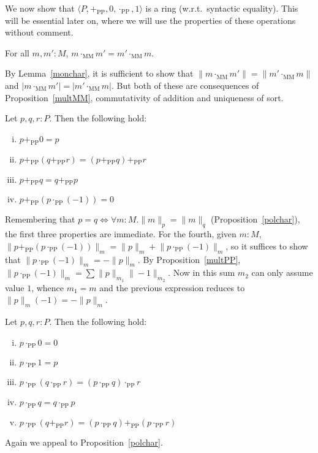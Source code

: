 \documentclass[numreferences]{kluwer}
\newcommand{\coeff}[2]{\ensuremath{\|#2\|_{#1}}}
\newcommand{\multMM}{\ensuremath{\cdot_{\mathrm{MM}}}}
\newcommand{\plusPP}{\ensuremath{+_{\mathrm{PP}}}}
\newcommand{\multPP}{\ensuremath{\cdot_{\mathrm{PP}}}}
\begin{document}
\begin{article}
We now show that $\langle P,\plusPP,0,\multPP,1\rangle$ is a ring
(w.r.t.\ syntactic equality).
This will be essential later on, where we will use the properties
of these operations without comment.

\begin{lemma}\label{multMMcomm}
For all $m,m':M$, $m\multMM m'=m'\multMM m$.
\end{lemma}
\begin{pf}
By Lemma~\ref{monchar}, it is sufficient to show that 
$\|m\multMM m'\|=\|m'\multMM m\|$ and $|m\multMM m'|=|m'\multMM m|$.  But
both of these are consequences of Proposition~\ref{multMM}, commutativity
of addition and uniqueness of sort.
\end{pf}

\begin{lemma}\label{plusPPprops}
Let $p,q,r:P$.  Then the following hold:
\begin{enumerate}[(i)]
\item $p\plusPP0=p$
\item $p\plusPP (q\plusPP r)=(p\plusPP q)\plusPP r$
\item $p\plusPP q=q\plusPP p$
\item $p\plusPP (p\multPP(-1))=0$
\end{enumerate}
\end{lemma}
\begin{pf} Remembering that $p=q\iff \forall m:M.\coeff pm=\coeff qm$
(Proposition~\ref{polchar}), the first three properties are immediate.
For the fourth, given $m:M$,
$\coeff m{p\plusPP(p\multPP(-1))}=\coeff mp+\coeff m{p\multPP(-1)}$, so
it suffices to show that $\coeff m{p\multPP(-1)}=-\coeff mp$.
By Proposition~\ref{multPP},
$\coeff m{p\multPP(-1)}=\sum\coeff{m_1}p\coeff{m_2}{-1}$.
Now in this sum $m_2$ can only assume value $1$, whence $m_1=m$ and
the previous expression reduces to $\coeff mp(-1)=-\coeff mp$.
\end{pf}

\begin{lemma}\label{multPPprops}
Let $p,q,r:P$.  Then the following hold:
\begin{enumerate}[(i)]
\item $p\multPP0=0$
\item $p\multPP1=p$
\item $p\multPP (q\multPP r)=(p\multPP q)\multPP r$
\item $p\multPP q=q\multPP p$
\item $p\multPP(q\plusPP r)=(p\multPP q)\plusPP(p\multPP r)$
\end{enumerate}
\end{lemma}
\begin{pf} Again we appeal to Proposition~\ref{polchar}.


\end{pf}
\end{article}
\end{document}
